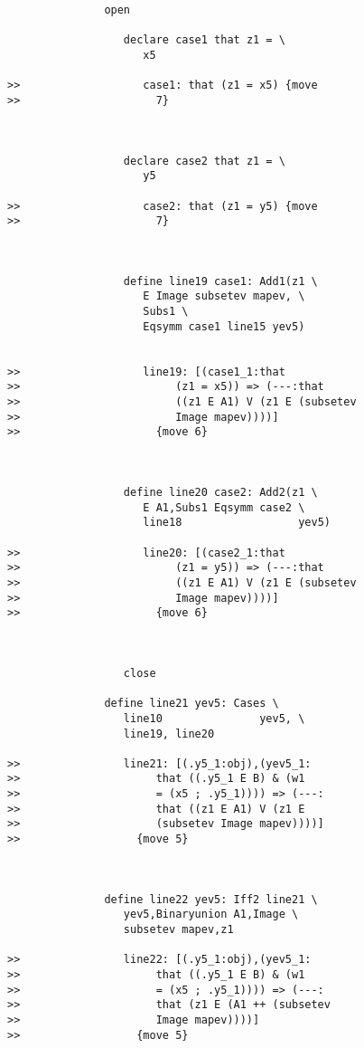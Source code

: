 \documentclass[12pt]{article}
\begin{document}
\begin{verbatim}
               open

                  declare case1 that z1 = \
                     x5

>>                   case1: that (z1 = x5) {move
>>                     7}



                  declare case2 that z1 = \
                     y5

>>                   case2: that (z1 = y5) {move
>>                     7}



                  define line19 case1: Add1(z1 \
                     E Image subsetev mapev, \
                     Subs1 \
                     Eqsymm case1 line15 yev5)


>>                   line19: [(case1_1:that
>>                        (z1 = x5)) => (---:that
>>                        ((z1 E A1) V (z1 E (subsetev
>>                        Image mapev))))]
>>                     {move 6}



                  define line20 case2: Add2(z1 \
                     E A1,Subs1 Eqsymm case2 \
                     line18                  yev5)

>>                   line20: [(case2_1:that
>>                        (z1 = y5)) => (---:that
>>                        ((z1 E A1) V (z1 E (subsetev
>>                        Image mapev))))]
>>                     {move 6}



                  close

               define line21 yev5: Cases \
                  line10               yev5, \
                  line19, line20

>>                line21: [(.y5_1:obj),(yev5_1:
>>                     that ((.y5_1 E B) & (w1
>>                     = (x5 ; .y5_1)))) => (---:
>>                     that ((z1 E A1) V (z1 E
>>                     (subsetev Image mapev))))]
>>                  {move 5}



               define line22 yev5: Iff2 line21 \
                  yev5,Binaryunion A1,Image \
                  subsetev mapev,z1

>>                line22: [(.y5_1:obj),(yev5_1:
>>                     that ((.y5_1 E B) & (w1
>>                     = (x5 ; .y5_1)))) => (---:
>>                     that (z1 E (A1 ++ (subsetev
>>                     Image mapev))))]
>>                  {move 5}




\end{verbatim}
\end{document}
